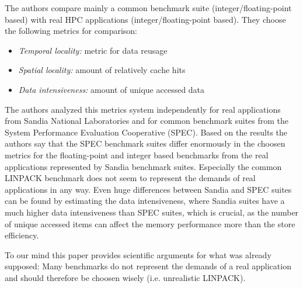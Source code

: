 \documentclass[oneside, a4paper, DIV=10]{scrartcl}
\begin{document}
\begin{itemize}
    The authors compare mainly a common benchmark suite (integer/floating-point based)
    with real HPC applications (integer/floating-point based). They choose the
    following metrics for comparison:
    \begin{itemize}
        \item \emph{Temporal locality:} metric for data reusage
        \item \emph{Spatial locality:} amount of relatively cache hits
        \item \emph{Data intensiveness:} amount of unique accessed data
    \end{itemize}
    The authors analyzed this metrics system independently for real
    applications from Sandia National Laboratories and for common benchmark
    suites from the System Performance Evaluation Cooperative (SPEC). Based on
    the results the authors say that the SPEC benchmark suites differ enormously
    in the choosen metrics for the floating-point and integer based benchmarks from the
    real applications represented by Sandia benchmark suites. Especially the common
    LINPACK benchmark does not seem to represent the demands of real applications
    in any way. Even huge differences between Sandia and SPEC suites can be found
    by estimating the data intensiveness, where Sandia suites have a much
    higher data intensiveness than SPEC suites, which is crucial, as the number
    of unique accessed items can affect the memory performance more than the 
    store efficiency.

    To our mind this paper provides scientific arguments for what was already
    supposed: Many benchmarks do not represent the demands of a real application
    and should therefore be choosen wisely (i.e. unrealistic LINPACK).
\end{itemize}    


    
\end{document}
